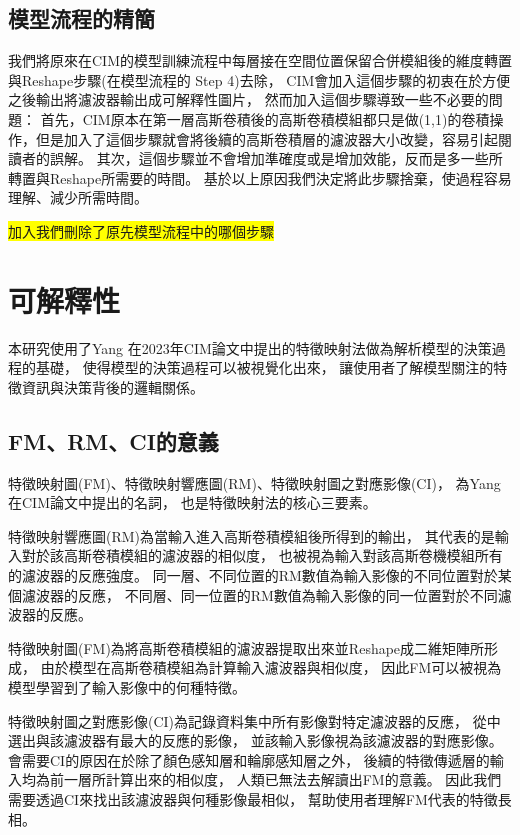 \documentclass[class=NCU_thesis, crop=false]{standalone}
\begin{document}
	\subsection{模型流程的精簡}

	我們將原來在CIM的模型訓練流程中每層接在空間位置保留合併模組後的維度轉置與Reshape步驟(在\cite{YangCNNInterpretable}模型流程的 Step 4)去除，
	CIM會加入這個步驟的初衷在於方便之後輸出將濾波器輸出成可解釋性圖片，
	然而加入這個步驟導致一些不必要的問題：
	首先，CIM原本在第一層高斯卷積後的高斯卷積模組都只是做(1,1)的卷積操作，但是加入了這個步驟就會將後續的高斯卷積層的濾波器大小改變，容易引起閱讀者的誤解。
	其次，這個步驟並不會增加準確度或是增加效能，反而是多一些所轉置與Reshape所需要的時間。
	基於以上原因我們決定將此步驟捨棄，使過程容易理解、減少所需時間。

	\colorbox {yellow}{加入我們刪除了原先模型流程中的哪個步驟}



\section{可解釋性} 
本研究使用了Yang 在2023年CIM論文中提出的特徵映射法做為解析模型的決策過程的基礎，
使得模型的決策過程可以被視覺化出來，
讓使用者了解模型關注的特徵資訊與決策背後的邏輯關係。
	
	\subsection{FM、RM、CI的意義}
	\label{section:InterablePicture}
	特徵映射圖(FM)、特徵映射響應圖(RM)、特徵映射圖之對應影像(CI)，
	為Yang在CIM論文中提出的名詞，
	也是特徵映射法的核心三要素。

	特徵映射響應圖(RM)為當輸入進入高斯卷積模組後所得到的輸出，
	其代表的是輸入對於該高斯卷積模組的濾波器的相似度，
	也被視為輸入對該高斯卷機模組所有的濾波器的反應強度。
	同一層、不同位置的RM數值為輸入影像的不同位置對於某個濾波器的反應，
	不同層、同一位置的RM數值為輸入影像的同一位置對於不同濾波器的反應。

	特徵映射圖(FM)為將高斯卷積模組的濾波器提取出來並Reshape成二維矩陣所形成，
	由於模型在高斯卷積模組為計算輸入濾波器與相似度，
	因此FM可以被視為模型學習到了輸入影像中的何種特徵。

	特徵映射圖之對應影像(CI)為記錄資料集中所有影像對特定濾波器的反應，
	從中選出與該濾波器有最大的反應的影像，
	並該輸入影像視為該濾波器的對應影像。
	會需要CI的原因在於除了顏色感知層和輪廓感知層之外，
	後續的特徵傳遞層的輸入均為前一層所計算出來的相似度，
	人類已無法去解讀出FM的意義。
	因此我們需要透過CI來找出該濾波器與何種影像最相似，
	幫助使用者理解FM代表的特徵長相。
\end{document}
